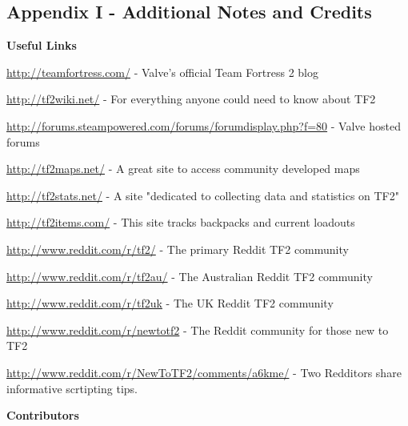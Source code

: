 \subsection{Appendix I - Additional Notes and Credits}
\newenvironment{packed_item}{
\begin{itemize}
  \setlength{\itemsep}{1pt}
  \setlength{\parskip}{0pt}
  \setlength{\parsep}{0pt}
}{\end{itemize}}


{\bf Useful Links}

\url{http://teamfortress.com/} - Valve's official Team Fortress 2 blog

\url{http://tf2wiki.net/} - For everything anyone could need to know about TF2

\url{http://forums.steampowered.com/forums/forumdisplay.php?f=80} - Valve hosted forums 

\url{http://tf2maps.net/} - A great site to access community developed maps

\url{http://tf2stats.net/} - A site "dedicated to collecting data and statistics on TF2"

\url{http://tf2items.com/} - This site tracks backpacks and current loadouts

\url{http://www.reddit.com/r/tf2/} - The primary Reddit TF2 community

\url{http://www.reddit.com/r/tf2au/} - The Australian Reddit TF2 community

\url{http://www.reddit.com/r/tf2uk} - The UK Reddit TF2 community

\url{http://www.reddit.com/r/newtotf2} - The Reddit community for those new to TF2

\url{http://www.reddit.com/r/NewToTF2/comments/a6kme/} - Two Redditors share informative scrtipting tips.


{\bf Contributors}

